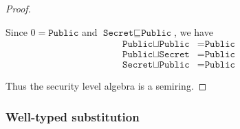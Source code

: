 \documentclass[conference]{IEEEtran}
\newcommand\public{\texttt{Public}}
\newcommand\secret{\texttt{Secret}}
\begin{document}
\begin{proof}
\begin{itemize}
		Since $0=\public$ and $\secret\sqsubseteq\public$, we have
		\begin{equation}
			\begin{aligned}
				\public\sqcup\public&=\public\\
				\public\sqcup\secret&=\public\\
				\secret\sqcup\public&=\public
			\end{aligned}
		\end{equation}
	\end{itemize}
	Thus the security level algebra is a semiring.
\end{proof}

\subsubsection{Well-typed substitution}
\end{document}
